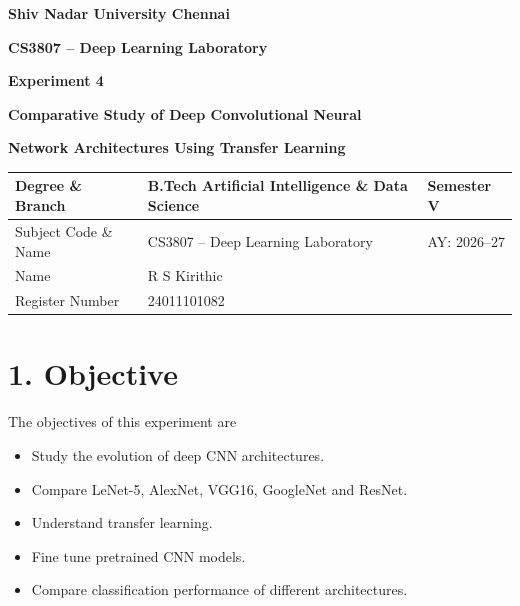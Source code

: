 \documentclass[11pt]{article}
\begin{document}

\begin{center}

{\Large\textbf{Shiv Nadar University Chennai}}

\vspace{3mm}

{\large\textbf{CS3807 -- Deep Learning Laboratory}}

\vspace{3mm}

{\Large\textbf{Experiment 4}}

\vspace{2mm}

{\Large\textbf{Comparative Study of Deep Convolutional Neural}}

{\Large\textbf{Network Architectures Using Transfer Learning}}

\end{center}

\vspace{5mm}

\begin{tabular}{|p{4cm}|p{8cm}|p{2cm}|}
\hline
Degree \& Branch &
B.Tech Artificial Intelligence \& Data Science &
Semester V\\
\hline
Subject Code \& Name &
CS3807 -- Deep Learning Laboratory &
AY: 2026--27\\
\hline
Name & R S Kirithic & \\
\hline
Register Number & 24011101082 & \\
\hline
\end{tabular}


\section*{1. Objective}

The objectives of this experiment are

\begin{itemize}

\item Study the evolution of deep CNN architectures.

\item Compare LeNet-5, AlexNet, VGG16, GoogleNet and ResNet.

\item Understand transfer learning.

\item Fine tune pretrained CNN models.

\item Compare classification performance of different architectures.

\end{itemize}
\end{document}

